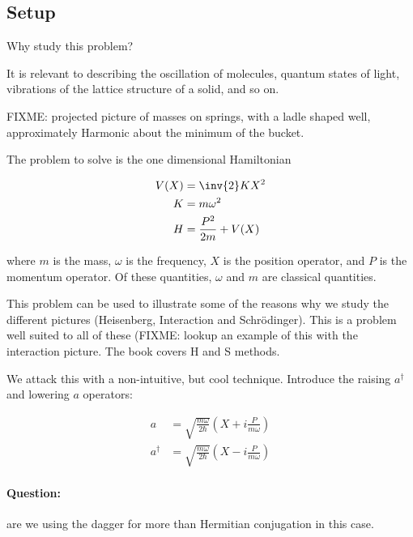 %
%

\subsection{Setup}
Why study this problem?

It is relevant to describing the oscillation of molecules, quantum states of light, vibrations of the lattice structure of a solid, and so on.

FIXME: projected picture of masses on springs, with a ladle shaped well, approximately Harmonic about the minimum of the bucket.

The problem to solve is the one dimensional Hamiltonian

\begin{align}\label{eqn:PHY356FLecture11:10}
V(X) &= \inv{2} K X^2 \\
K &= m \omega^2 \\
H &= \frac{P^2}{2m} + V(X)
\end{align}

where $m$ is the mass, $\omega$ is the frequency, $X$ is the position operator, and $P$ is the momentum operator.  Of these quantities, $\omega$ and $m$ are classical quantities.

This problem can be used to illustrate some of the reasons why we study the different pictures (Heisenberg, Interaction and Schr\"{o}dinger).  This is a problem well suited to all of these (FIXME: lookup an example of this with the interaction picture.  The book covers H and S methods.

We attack this with a non-intuitive, but cool technique.  Introduce the raising $a^\dagger$ and lowering $a$ operators:

\begin{align}\label{eqn:PHY356FLecture11:20}
a &= \sqrt{\frac{m \omega}{2 \hbar}} \left( X + i \frac{P}{m\omega} \right) \\
a^\dagger &= \sqrt{\frac{m \omega}{2 \hbar}} \left( X - i \frac{P}{m\omega} \right)
\end{align}

\paragraph{Question:} are we using the dagger for more than Hermitian conjugation in this case.

